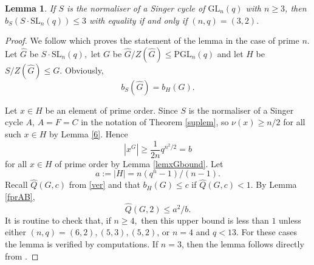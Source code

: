 \documentclass[a4paper,reqno,11pt]{amsart}
\newtheorem{Lem}[Th]{Lemma}
\theoremstyle{definition}
\theoremstyle{remark}
\numberwithin{equation}{section}
\newcommand{\SL}{{\mathrm{SL}}}
\newcommand{\GL}{{\mathrm{GL}}}
\newcommand{\PGL}{{\mathrm{PGL}}}
\begin{document}
\begin{Lem}\label{sinbase}
If $S$ is the normaliser of a Singer cycle of $\GL_n(q)$ with $n\ge 3$, then $b_{S}(S \cdot \SL_n(q)) \le 3$ with equality if and only if $(n,q)=(3,2).$
\end{Lem}
\begin{proof}
We follow \cite[Lemma 6.4]{burPS} which proves the statement of the lemma in the case of prime $n$. Let $\hat{G}$ be $S \cdot \SL_n(q),$ let  $G$ be $\hat{G}/Z(\hat{G})\le \PGL_n(q)$ and let $H$ be $S/Z(\hat{G})\le G.$   Obviously, 
$$b_S(\hat{G})=b_H(G).$$

Let $x\in H$ be an element of prime order. Since $S$ is the normaliser of a Singer cycle $A$, $A=F=C$ in the notation of Theorem \ref{suplem}, so $\nu(x) \ge n/2$ for all such $x \in H$ by Lemma \ref{6}.  Hence
$$|x^G| \ge \frac{1}{2n}q^{n^2/2}=b$$ 
for all $x \in H$ of prime order  by Lemma \ref{lemxGbound}. Let $$a:=|H|=n(q^n-1)/(n-1).$$
Recall $\hat{Q}(G,c)$ from \eqref{ver} and that $b_H(G)\le c$ if  $\hat{Q}(G,c)<1.$ By Lemma \ref{fprAB}, 
$$\hat{Q}(G,2) \le  a^2/b.$$
 It is routine to check that, if $n \ge 4,$ then this upper bound is less than $1$ unless  either $(n,q)=(6,2),(5,3), (5,2)$, or $n=4$ and  $q<13.$ For these cases the lemma is verified by computations. If $n=3$, then the lemma follows directly from \cite[Lemma 6.4]{burPS}.
\end{proof}
\end{document}
